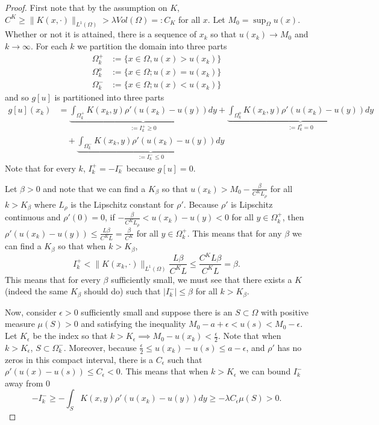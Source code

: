 \documentclass[aps,
preprint,
groupedaddress,
showkeys,
amsmath]{revtex4-2}
\begin{document}
    
    \begin{proof}
        First note that by the assumption on $K$, $C^K\geq \|K(x,\cdot)\|_{L^1(\Omega)}>\lambda Vol(\Omega)=:C_K$ for all $x$. 
        Let $M_0=\sup_{\Omega}u(x)$. Whether or not it is attained, there is a sequence of $x_k$ so that $u(x_k)\to M_0$ and $k\to \infty$. For each $k$ we partition the domain into three parts
        \begin{equation*}
        \begin{split}
            \Omega^+_k&:=\{x\in \Omega, u(x)>u(x_k)\}\\
            \Omega^o_k&:=\{x\in \Omega; u(x)=u(x_k)\}\\
            \Omega^-_k&:=\{x\in \Omega; u(x)<u(x_k)\}
        \end{split}
        \end{equation*}
        and so $g[u]$ is partitioned into three parts
        \begin{equation*}  
            \begin{split} 
                g[u](x_k)& =\underbrace{\int_{\Omega^+_k}K(x_k,y)\rho'(u(x_k)-u(y))dy}_{:=I_k^+\geq 0}+\underbrace{\int_{\Omega^o_k}K(x_k,y)\rho'(u(x_k)-u(y))dy}_{:=I_k^o=0}\\
                &\quad +\underbrace{\int_{\Omega^-_k}K(x_k,y)\rho'(u(x_k)-u(y))dy}_{:=I_k^-\leq0}\end{split}\end{equation*}
        Note that for every $k$, $I^+_k=-I^-_k$ because $g[u]=0$. 

        Let $\beta>0$ and note that we can find a $K_\beta$ so that $u(x_k)>M_0-\frac{\beta}{C^KL_\rho}$ for all $k>K_\beta$ where $L_\rho$ is the Lipschitz constant for $\rho'$. Because $\rho'$ is Lipschitz continuous and $\rho'(0)=0$, if $-\frac{\beta}{C^KL_\rho}<u(x_k)-u(y)<0$ for all $y\in \Omega^+_k$, then $\rho'(u(x_k)-u(y))\leq \frac{L\beta}{C^KL}=\frac{\beta}{C^K}$ for all $y\in \Omega^+_k$. 
        This means that for any $\beta$ we can find a $K_\beta$ so that when $k>K_\beta$,
        \[I_k^+<\|K(x_k,\cdot)\|_{L^1(\Omega)}\frac{L\beta}{C^KL}\leq\frac{C^KL\beta}{C^KL}=\beta. \]
        This means that for every $\beta$ sufficiently small, we must see that there exists a $K$ (indeed the same $K_\beta$ should do) such that $|I_k^-|\leq\beta$ for all $k>K_\beta$.

        Now, consider $\epsilon>0$ sufficiently small and suppose there is an $S\subset\Omega$ with positive measure $\mu(S)>0$ and satisfying the inequality $M_0-a+\epsilon<u(s)<M_0-\epsilon$. Let $K_{\epsilon}$ be the index so that $k>K_{\epsilon}\implies M_0-u(x_k)<\frac{\epsilon}{2}$. Note that when $k>K_{\epsilon}$, $S\subset \Omega ^-_k$. Moreover, because $\frac{\epsilon}{2}\leq u(x_k)-u(s)\leq a-\epsilon$, and $\rho'$ has no zeros in this compact interval, there is a $C_\epsilon$ such that $\rho'(u(x)-u(s))\le C_\epsilon<0$. This means that when $k>K_{\epsilon}$ we can bound $I^-_k$ away from $0$
        \[
        -I^-_k\geq -\int_SK(x,y)\rho'(u(x_k)-u(y))dy\geq -\lambda C_\epsilon \mu(S)>0.
        \]


\end{proof}
\end{document}
